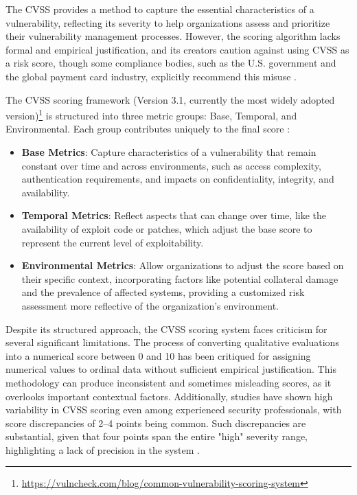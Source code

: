 The \ac{CVSS} provides a method to capture the essential characteristics of a vulnerability, reflecting its severity to help organizations assess and prioritize their vulnerability management processes. However, the scoring algorithm lacks formal and empirical justification, and its creators caution against using \ac{CVSS} as a risk score, though some compliance bodies, such as the U.S. government and the global payment card industry, explicitly recommend this misuse \autocite{spring_time_2021}.

The \ac{CVSS} scoring framework (Version 3.1, currently the most widely adopted version)\footnote{\url{https://vulncheck.com/blog/common-vulnerability-scoring-system}} is structured into three metric groups: Base, Temporal, and Environmental. Each group contributes uniquely to the final score \autocite{first_cvss_2025}:

\begin{itemize} 
    \item \textbf{Base Metrics}: Capture characteristics of a vulnerability that remain constant over time and across environments, such as access complexity, authentication requirements, and impacts on confidentiality, integrity, and availability. 
    \item \textbf{Temporal Metrics}: Reflect aspects that can change over time, like the availability of exploit code or patches, which adjust the base score to represent the current level of exploitability. 
    \item \textbf{Environmental Metrics}: Allow organizations to adjust the score based on their specific context, incorporating factors like potential collateral damage and the prevalence of affected systems, providing a customized risk assessment more reflective of the organization's environment. 
\end{itemize}

Despite its structured approach, the \ac{CVSS} scoring system faces criticism for several significant limitations. The process of converting qualitative evaluations into a numerical score between 0 and 10 has been critiqued for assigning numerical values to ordinal data without sufficient empirical justification. This methodology can produce inconsistent and sometimes misleading scores, as it overlooks important contextual factors. Additionally, studies have shown high variability in \ac{CVSS} scoring even among experienced security professionals, with score discrepancies of 2–4 points being common. Such discrepancies are substantial, given that four points span the entire "high" severity range, highlighting a lack of precision in the system \autocite{spring_time_2021}.

